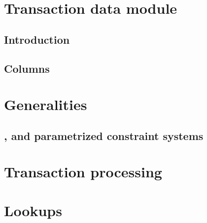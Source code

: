 
\section{Transaction data module}                                           \label{user txn data: generalities}
\subsection{Introduction}                                                   \label{user txn data: intro}                                       
\subsection{Columns}                                                        \label{user txn data: columns}                                     

\section{Generalities}                                                      \label{user txn data: generalities}                                
\subsection{\wcpFlag{}, \eucFlag{} and parametrized constraint systems}     \label{user txn data: constraints: comparison constraints}         
\section{Transaction processing}                                            \label{user txn data: processing}                                  
\section{Lookups}                                                           \label{user txn data: lookups}                                     
